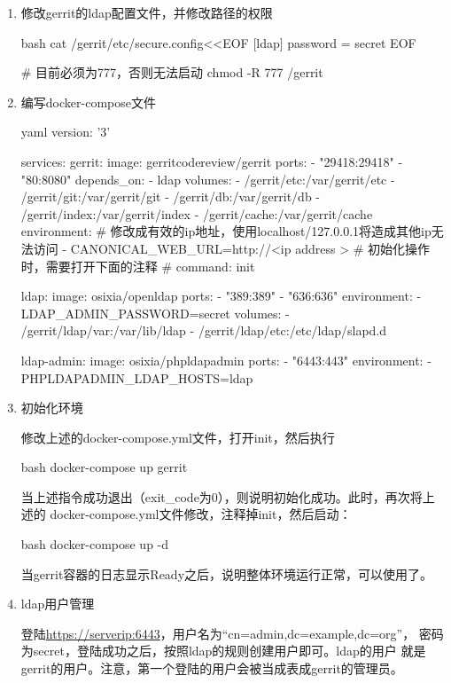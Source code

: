 \begin{enumerate}
  \item 修改gerrit的ldap配置文件，并修改路径的权限

  \begin{code-block}{bash}
  cat /gerrit/etc/secure.config<<EOF
  [ldap]
    password = secret
  EOF

  # 目前必须为777，否则无法启动
  chmod -R 777 /gerrit
  \end{code-block}

  \item 编写docker-compose文件

  \begin{code-block}{yaml}
  version: '3'

  services:
    gerrit:
      image: gerritcodereview/gerrit
      ports:
        - "29418:29418"
        - "80:8080"
      depends_on:
        - ldap
      volumes:
        - /gerrit/etc:/var/gerrit/etc
        - /gerrit/git:/var/gerrit/git
        - /gerrit/db:/var/gerrit/db
        - /gerrit/index:/var/gerrit/index
        - /gerrit/cache:/var/gerrit/cache
      environment:
        # 修改成有效的ip地址，使用localhost/127.0.0.1将造成其他ip无法访问
        - CANONICAL_WEB_URL=http://<ip address >
      # 初始化操作时，需要打开下面的注释
      # command: init

    ldap:
      image: osixia/openldap
      ports:
        - "389:389"
        - "636:636"
      environment:
        - LDAP_ADMIN_PASSWORD=secret
      volumes:
        - /gerrit/ldap/var:/var/lib/ldap
        - /gerrit/ldap/etc:/etc/ldap/slapd.d

    ldap-admin:
      image: osixia/phpldapadmin
      ports:
        - "6443:443"
      environment:
        - PHPLDAPADMIN_LDAP_HOSTS=ldap
  \end{code-block}

  \item 初始化环境

  修改上述的docker-compose.yml文件，打开init，然后执行
  \begin{code-block}{bash}
  docker-compose up gerrit
  \end{code-block}
  当上述指令成功退出（exit\_code为0），则说明初始化成功。此时，再次将上述的
  docker-compose.yml文件修改，注释掉init，然后启动：
  \begin{code-block}{bash}
  docker-compose up -d
  \end{code-block}
  当gerrit容器的日志显示Ready之后，说明整体环境运行正常，可以使用了。

  \item ldap用户管理

  登陆\url{https://serverip:6443}，用户名为“cn=admin,dc=example,dc=org”，
  密码为secret，登陆成功之后，按照ldap的规则创建用户即可。ldap的用户
  就是gerrit的用户。注意，第一个登陆的用户会被当成表成gerrit的管理员。

\end{enumerate}

